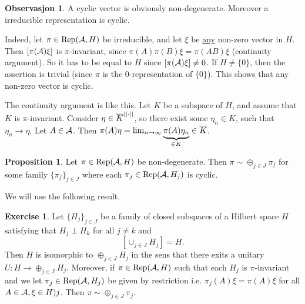 \documentclass[10pt,english,a4paper]{article}
\theoremstyle{definition}
\newtheorem*{proposition}{Proposition}
\newtheorem*{observation}{Observasjon}
\newtheorem*{exercise}{Exercise}
\DeclareMathOperator{\Rep}{Rep}
\begin{document}
\begin{observation}
    A cyclic vector is obviously non-degenerate. Moreover a irreducible
representation is cyclic. 

Indeed, let $\pi \in \Rep(\As, H)$ be irreducible,
and let $\xi$ be \ul{any} non-zero vector in $H$.  Then $[\pi(\mathcal{A})\xi]$ is
$\pi$-invariant, since $\pi(A)\pi(B) \xi = \pi(AB)\xi$ (continuity argument).  So
it has to be equal to $H$ since $[\pi(\mathcal{A})\xi]\neq 0$. If $H\neq \{0\}$, then
the assertion is trivial (since $\pi$ is the $0$-representation of $\{0\}$).
This shows that any non-zero vector is cyclic. 

The continuity argument is like this. Let $K$ be a subspace of $H$, and 
assume that $K$ is $\pi$-invariant. Consider $\eta \in \overline{K}^{||\cdot||}$,
so there exist some $\eta_n \in K$, such that $\eta_n\to \eta$. 
Let $A \in \mathcal{A}$. Then $\pi(A)\eta = \lim_{n\to\infty} \underbrace{\pi(A)\eta_n}_{\in K} \in \overline{K}$.
\end{observation}

\begin{proposition}
Let $\pi \in \Rep(\As,H)$ be non-degenerate. Then $\pi \sim \oplus_{j\in J}\pi_j$
for some family $\{\pi_j\}_{j\in J}$ where each $\pi_j \in \Rep(\As,H_j)$ is cyclic.
\end{proposition}
We will use the following result.
\begin{exercise}
Let $\{H_j\}_{j\in J}$ be a family of closed subspaces of a Hilbert space $H$
satisfying that $H_j \perp H_k$ for all $j\neq k$ and 
\[ \left[ \cup_{j\in J}H_j \right] = H. \]
Then $H$ is isomorphic to $\oplus_{j\in J} H_j$ in the sens that there exits a
unitary $U \colon H \to \oplus_{j\in J} H_j$. Moreover, if 
$\pi \in \Rep(\As,H)$ such that each $H_j$ is $\pi$-invariant and we let
$\pi_j\in \Rep(\As,H_j)$ be given by restriction i.e.
$\pi_j(A)\xi = \pi(A)\xi$ for all $A\in \mathcal{A}, \xi\in H)j$.
Then $\pi \sim \oplus_{j\in J}\pi_j$.
\end{exercise}
\end{document}
